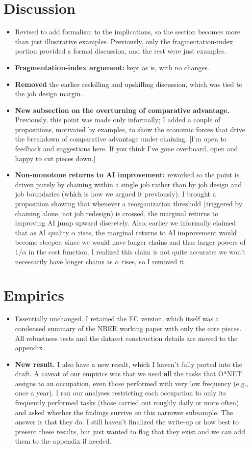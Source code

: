 \documentclass[11pt]{article}
\begin{document}
\section*{Discussion}
\begin{itemize}
\item Revised to add formalism to the implications, so the section becomes more than just illustrative examples. Previously, only the fragmentation-index portion provided a formal discussion, and the rest were just examples. 
\item \textbf{Fragmentation-index argument:} kept as is, with no changes.
\item \textbf{Removed} the earlier reskilling and upskilling discussion, which was tied to the job design margin.
\item \textbf{New subsection on the overturning of comparative advantage.} Previously, this point was made only informally; I added a couple of propositions, motivated by examples, to show the economic forces that drive the breakdown of comparative advantage under chaining. [I'm open to feedback and suggestions here. If you think I've gone overboard, open and happy to cut pieces down.]
\item \textbf{Non-monotone returns to AI improvement:} reworked so the point is driven purely by chaining within a single job rather than by job design and job boundaries (which is how we argued it previously). I brought a proposition showing that whenever a reorganization threshold (triggered by chaining alone, not job redesign) is crossed, the marginal returns to improving AI jump upward discretely. Also, earlier we informally claimed that as AI quality $\alpha$ rises, the marginal returns to AI improvement would become steeper, since we would have longer chains and thus larger powers of $1/\alpha$ in the cost function. I realized this claim is not quite accurate: we won't necessarily have longer chains as $\alpha$ rises, so I removed it.
\end{itemize}

\section*{Empirics}
\begin{itemize}
\item Essentially unchanged. I retained the EC version, which itself was a condensed summary of the NBER working paper with only the core pieces. All robustness tests and the dataset construction details are moved to the appendix.
\item \textbf{New result.} I also have a new result, which I haven't fully ported into the draft. A caveat of our empirics was that we used \textbf{all} the tasks that O*NET assigns to an occupation, even those performed with very low frequency (e.g., once a year). I ran our analyses restricting each occupation to only its frequently performed tasks (those carried out roughly daily or more often) and asked whether the findings survive on this narrower subsample. The answer is that they do. I still haven't finalized the write-up or how best to present these results, but just wanted to flag that they exist and we can add them to the appendix if needed.
\end{itemize}
\end{document}
